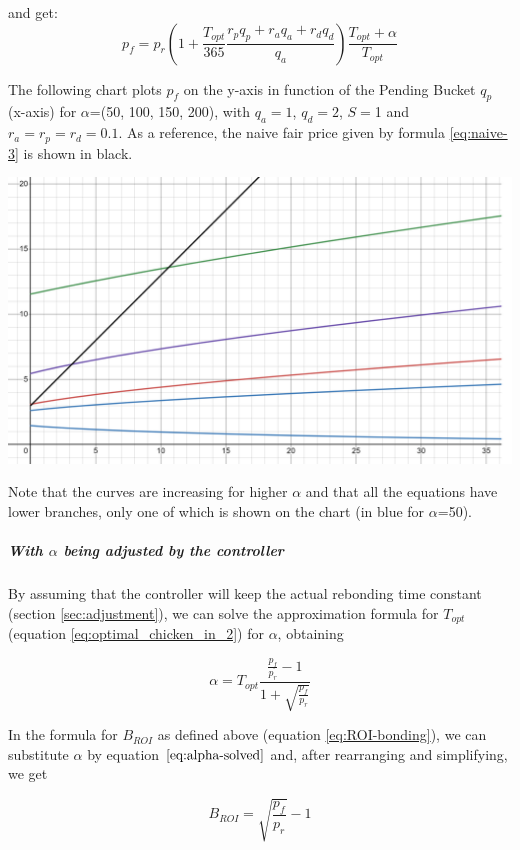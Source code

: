 \documentclass{article}
\begin{document}
and get:
\begin{equation}
  \label{eq:ROI-bonding-holding-2}
  p_f = p_r\left(1 + \frac{T_{opt}}{365} \frac{r_p q_p + r_a q_a + r_d q_d}{q_a}\right) \frac{T_{opt}+\alpha}{T_{opt}}
\end{equation}

The following chart plots $p_f$ on the y-axis in function of the Pending Bucket $q_p$ (x-axis) for $\alpha$=(50, 100, 150, 200), with $q_a=1$, $q_d=2$, $S=$1 and $r_a=r_p=r_d=0.1$. As a reference, the naive fair price given by formula \ref{eq:naive-3} is shown in black.

\includegraphics[width=\linewidth]{./ChickenBonds_Whitepaper_comparison_price.png}

Note that the curves are increasing for higher $\alpha$ and that all the equations have lower branches, only one of which is shown on the chart (in blue for $\alpha$=50). 

\subparagraph{With $\alpha$ being adjusted by the controller}
By assuming that the controller will keep the actual rebonding time constant (section \ref{sec:adjustment}), we can solve the approximation formula for $T_{opt}$ (equation \ref{eq:optimal_chicken_in_2}) for $\alpha$, obtaining

\begin{equation}
  \label{eq:alpha-solved}
  \alpha = T_{opt}\frac{\frac{p_f}{p_r} - 1}{1 + \sqrt{\frac{p_f}{p_r}}}
\end{equation} 

In the formula for $B_{ROI}$ as defined above (equation \ref{eq:ROI-bonding}), we can substitute $\alpha$ by equation $\ref{eq:alpha-solved}$ and, after rearranging and simplifying, we get

\begin{equation}
  \label{eq:BROI-controller}
    B_{ROI} = \sqrt{\frac{p_f}{p_r}} - 1
\end{equation} 
\end{document}
